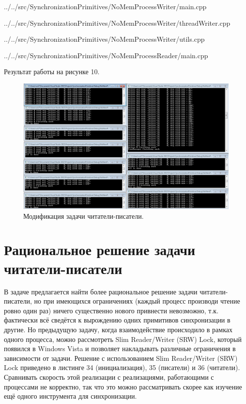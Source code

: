 \documentclass[a4paper, 12pt]{article}		%
\begin{document}

{../../src/SynchronizationPrimitives/NoMemProcessWriter/main.cpp}


{../../src/SynchronizationPrimitives/NoMemProcessWriter/threadWriter.cpp}


{../../src/SynchronizationPrimitives/NoMemProcessWriter/utils.cpp}
\newpage


{../../src/SynchronizationPrimitives/NoMemProcessReader/main.cpp}
\newpage

Результат работы на рисунке 10.

\begin{figure}[h!]
\centering
\includegraphics[scale=0.50]{res/008}
\caption{Модификация задачи читатели-писатели.}
\end{figure}

\newpage
\section{Рациональное решение задачи читатели-писатели}

В задаче предлагается найти более рациональное решение задачи читатели-писатели, но при имеющихся ограничениях (каждый процесс производи чтение ровно один раз) ничего существенно нового привнести невозможно, т.к. фактически всё сведётся к вырождению одних примитивов синхронизации в другие. Но предыдущую задачу, когда взаимодействие происходило в рамках одного процесса, можно рассмотреть Slim Reader/Writer (SRW) Lock, который появился в Windows Vista и позволяет накладывать различные ограничения в зависимости от задачи.
Решение с использованием Slim Reader/Writer (SRW) Lock приведено в листинге 34 (инициализация), 35 (писатели) и 36 (читатели). Сравнивать скорость этой реализации с реализациями, работающими с процессами не корректно, так что это можно рассматривать скорее как изучение ещё одного инструмента для синхронизации.
\end{document}
